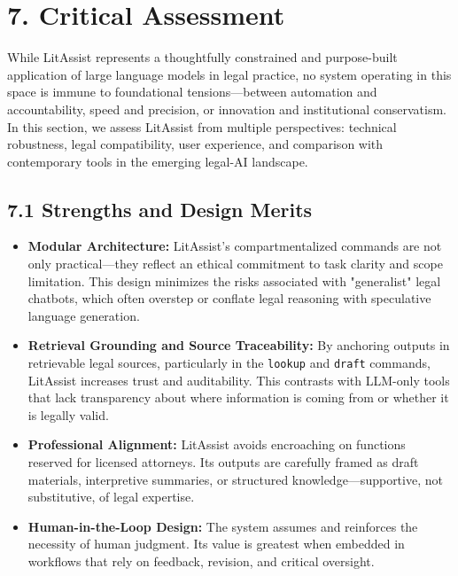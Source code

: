 \documentclass[12pt,a4paper]{article}
\begin{document}
\section*{7. Critical Assessment}

While LitAssist represents a thoughtfully constrained and purpose-built application of large language models in legal practice, no system operating in this space is immune to foundational tensions—between automation and accountability, speed and precision, or innovation and institutional conservatism. In this section, we assess LitAssist from multiple perspectives: technical robustness, legal compatibility, user experience, and comparison with contemporary tools in the emerging legal-AI landscape.

\subsection*{7.1 Strengths and Design Merits}

\begin{itemize}
\item \textbf{Modular Architecture:} LitAssist's compartmentalized commands are not only practical—they reflect an ethical commitment to task clarity and scope limitation. This design minimizes the risks associated with "generalist" legal chatbots, which often overstep or conflate legal reasoning with speculative language generation.

\item \textbf{Retrieval Grounding and Source Traceability:} By anchoring outputs in retrievable legal sources, particularly in the \texttt{lookup} and \texttt{draft} commands, LitAssist increases trust and auditability. This contrasts with LLM-only tools that lack transparency about where information is coming from or whether it is legally valid.

\item \textbf{Professional Alignment:} LitAssist avoids encroaching on functions reserved for licensed attorneys. Its outputs are carefully framed as draft materials, interpretive summaries, or structured knowledge—supportive, not substitutive, of legal expertise.

\item \textbf{Human-in-the-Loop Design:} The system assumes and reinforces the necessity of human judgment. Its value is greatest when embedded in workflows that rely on feedback, revision, and critical oversight.
\end{itemize}
\end{document}
